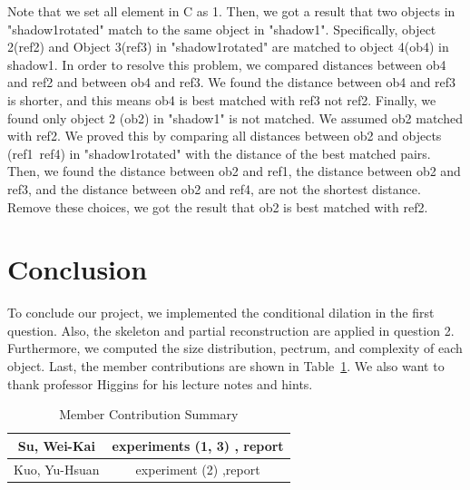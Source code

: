 \documentclass[paper=a4, fontsize=11pt]{scrartcl}
\begin{document}
Note that we set all element in C as 1. Then, we got a result that two objects in "shadow1rotated" match to the same object in "shadow1". Specifically, object 2(ref2) and Object 3(ref3) in "shadow1rotated" are matched to object 4(ob4) in shadow1. In order to resolve this problem, we compared distances between ob4 and ref2 and between ob4 and ref3.  We found the distance between ob4 and ref3 is shorter,  and this means ob4 is best matched with ref3 not ref2. Finally, we found only object 2 (ob2) in "shadow1"  is not matched. We assumed ob2 matched with ref2. We proved this by comparing all distances between ob2 and objects (ref1~ref4) in "shadow1rotated" with the distance of the best matched pairs. Then, we found the distance between ob2 and ref1, the distance between ob2 and ref3, and the distance between ob2 and ref4, are not the shortest distance. Remove these choices, we got the result that ob2 is best matched with ref2.







\section{Conclusion}
To conclude our project, we implemented the conditional dilation in the first question. Also, the skeleton and partial reconstruction are applied in question 2. Furthermore, we computed the size distribution, pectrum, and complexity of each object.  Last, the member contributions are shown in Table~\ref{tab:contr}. We also want to thank professor Higgins for his lecture notes and hints.

\begin{table}
	\centering
	\caption{Member Contribution Summary}
	\begin{tabular}{c|c} \hline
       Su, Wei-Kai & experiments (1, 3) , report \\ \hline
	Kuo, Yu-Hsuan & experiment (2) ,report \\ \hline
	
	\end{tabular}
	\label{tab:contr}
\end{table}
\end{document}
